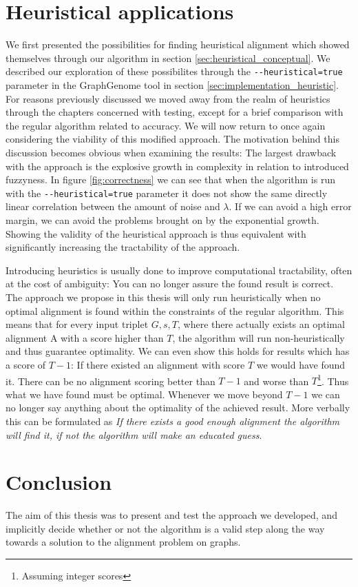 \documentclass[thesis.tex]{subfiles}
\begin{document}
\section{Heuristical applications}
We first presented the possibilities for finding heuristical alignment which showed themselves through our algorithm in section \ref{sec:heuristical_conceptual}. We described our exploration of these possibilites through the \texttt{-{}-heuristical=true} parameter in the GraphGenome tool in section \ref{sec:implementation_heuristic}. For reasons previously discussed we moved away from the realm of heuristics through the chapters concerned with testing, except for a brief comparison with the regular algorithm related to accuracy. We will now return to once again considering the viability of this modified approach. The motivation behind this discussion becomes obvious when examining the results: The largest drawback with the approach is the explosive growth in complexity in relation to introduced fuzzyness. In figure \ref{fig:correctness} we can see that when the algorithm is run with the \texttt{-{}-heuristical=true} parameter it does not show the same directly linear correlation between the amount of noise and $\lambda$. If we can avoid a high error margin, we can avoid the problems brought on by the exponential growth. Showing the validity of the heuristical approach is thus equivalent with significantly increasing the tractability of the approach.\\
\par\noindent
Introducing heuristics is usually done to improve computational tractability, often at the cost of ambiguity: You can no longer assure the found result is correct. The approach we propose in this thesis will only run heuristically when no optimal alignment is found within the constraints of the regular algorithm. This means that for every input triplet ${G, s, T}$, where there actually exists an optimal alignment A with a score higher than $T$, the algorithm will run non-heuristically and thus guarantee optimality. We can even show this holds for results which has a score of $T-1$: If there existed an alignment with score $T$ we would have found it. There can be no alignment scoring better than $T-1$ and worse than $T$\footnote{Assuming integer scores}. Thus what we have found must be optimal. Whenever we move beyond $T-1$ we can no longer say anything about the optimality of the achieved result. More verbally this can be formulated as \textit{If there exists a good enough alignment the algorithm will find it, if not the algorithm will make an educated guess}.
\section{Conclusion}
The aim of this thesis was to present and test the approach we developed, and implicitly decide whether or not the algorithm is a valid step along the way towards a solution to the alignment problem on graphs.
\end{document}
